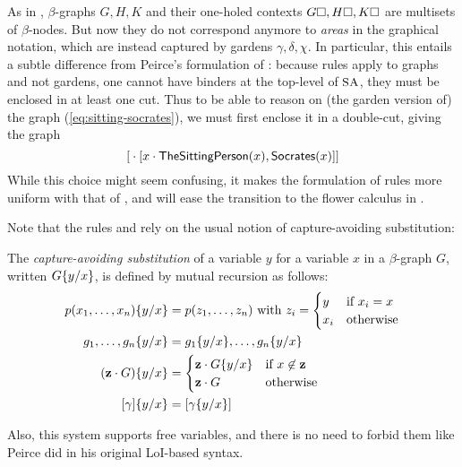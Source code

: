 \begin{remark}
  As in , $\beta$-graphs $G, H, K$ and their one-holed contexts
  $G\square, H\square, K\square$ are multisets of $\beta$-nodes. But now they do not
  correspond anymore to \emph{areas} in the graphical notation, which are
  instead captured by gardens $\gamma, \delta, \chi$. In particular, this
  entails a subtle difference from Peirce's formulation of : because
  rules apply to graphs and not gardens, one cannot have binders at the
  top-level of $\small\textsc{SA}$, they must be enclosed in at least one cut. Thus to be able
  to reason on (the garden version of) the graph (\ref{eq:sitting-socrates}), we
  must first enclose it in a double-cut, giving the graph
  $$[{} \cdot [x \cdot \mathsf{TheSittingPerson}(x),\mathsf{Socrates}(x)]]$$
  While this choice might seem confusing, it makes the formulation of rules more
  uniform with that of , and will ease the transition to the flower
  calculus in .
\end{remark}

Note that the rules  and  rely on the usual notion
of capture-avoiding substitution:

\begin{definition}
  The \emph{capture-avoiding substitution} of a variable $y$ for a variable $x$
  in a $\beta$-graph $G$, written $G \{ y / x \}$, is defined by mutual
  recursion as follows:
  \begin{align*}
    \subst{p(x_1,\ldots,x_n)}{y}{x} &= p(z_1, \ldots, z_n) \text{ with } z_i = \begin{cases}
      y &\text{if $x_i = x$} \\
      x_i &\text{otherwise}
    \end{cases} \\
    \subst{g_1, \ldots, g_n}{y}{x} &= \subst{g_1}{y}{x}, \ldots, \subst{g_n}{y}{x} \\
    \subst{(\garden{\bz}{G})}{y}{x} &= \begin{cases}
      \garden{\bz}{\subst{G}{y}{x}} &\text{if $x \not\in \bz$} \\
      \garden{\bz}{G} &\text{otherwise}
    \end{cases} \\
    \subst{[\gamma]}{y}{x} &= [\subst{\gamma}{y}{x}]
  \end{align*}
\end{definition}

Also, this system supports free variables, and there is no need to forbid them
like Peirce did in his original LoI-based syntax.